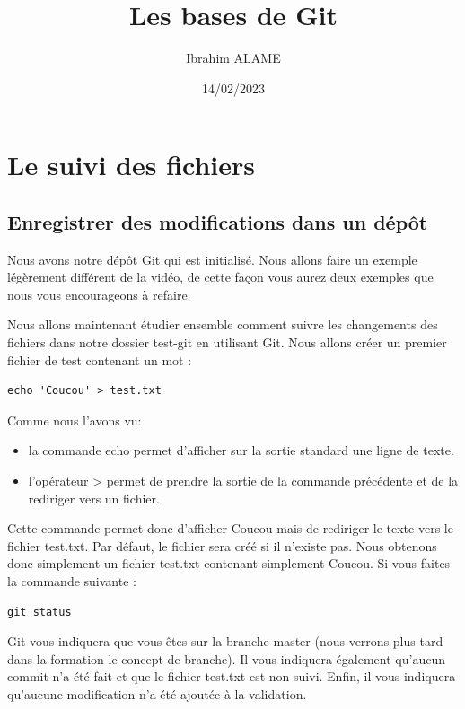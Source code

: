 \documentclass{article}
\title{Les bases de {\color{blue}Git}}
\author{Ibrahim ALAME}
\date{14/02/2023}
\begin{document}
\maketitle

\section{Le suivi des fichiers}  
\subsection{Enregistrer des modifications dans un dépôt}
Nous avons notre dépôt {\color{blue} Git} qui est initialisé. Nous allons faire un exemple légèrement différent de la vidéo, de cette façon vous aurez deux exemples que nous vous encourageons à refaire.

Nous allons maintenant étudier ensemble comment suivre les changements des fichiers dans notre dossier test-git en utilisant {\color{blue} Git}. Nous allons créer un premier fichier de test contenant un mot :

\begin{verbatim}
echo 'Coucou' > test.txt
\end{verbatim}

Comme nous l'avons vu:
\begin{itemize}
 \item la commande {\color{blue} echo} permet d'afficher sur la sortie standard une ligne de texte. \item l'opérateur {\color{blue} >} permet de prendre la sortie de la commande précédente et de la rediriger vers un fichier.
\end{itemize}


Cette commande permet donc d'afficher {\color{blue} Coucou} mais de rediriger le texte vers le fichier {\color{blue} test.txt}. Par défaut, le fichier sera créé si il n'existe pas. Nous obtenons donc simplement un fichier {\color{blue} test.txt} contenant simplement Coucou. Si vous faites la commande suivante :

\begin{verbatim}
git status
\end{verbatim}

{\color{blue} Git} vous indiquera que vous êtes sur la branche {\color{blue} master} (nous verrons plus tard dans la formation le concept de branche). Il vous indiquera également qu'aucun {\color{blue} commit} n'a été fait et que le fichier {\color{blue} test.txt} est non suivi. Enfin, il vous indiquera qu'aucune modification n'a été ajoutée à la validation.
\end{document}
